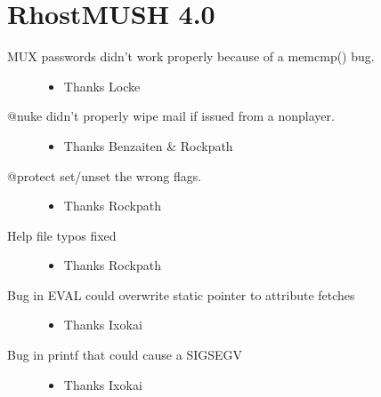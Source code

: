 \documentclass[letterpaper,10pt,english]{sphinxmanual}
\begin{document}
\section{RhostMUSH 4.0}
\label{\detokenize{changelog:rhostmush-4-0}}\label{\detokenize{changelog:changelog-4-0}}\begin{description}
\item[{MUX passwords didn’t work properly because of a memcmp() bug.}] \leavevmode\begin{itemize}
\item {} 
\sphinxAtStartPar
Thanks Locke

\end{itemize}

\item[{@nuke didn’t properly wipe mail if issued from a non\sphinxhyphen{}player.}] \leavevmode\begin{itemize}
\item {} 
\sphinxAtStartPar
Thanks Benzaiten \& Rockpath

\end{itemize}

\item[{@protect set/unset the wrong flags.}] \leavevmode\begin{itemize}
\item {} 
\sphinxAtStartPar
Thanks Rockpath

\end{itemize}

\item[{Help file typos fixed}] \leavevmode\begin{itemize}
\item {} 
\sphinxAtStartPar
Thanks Rockpath

\end{itemize}

\item[{Bug in EVAL could overwrite static pointer to attribute fetches}] \leavevmode\begin{itemize}
\item {} 
\sphinxAtStartPar
Thanks Ixokai

\end{itemize}

\item[{Bug in printf that could cause a SIGSEGV}] \leavevmode\begin{itemize}
\item {} 
\sphinxAtStartPar
Thanks Ixokai

\end{itemize}


\end{description}
\end{document}
